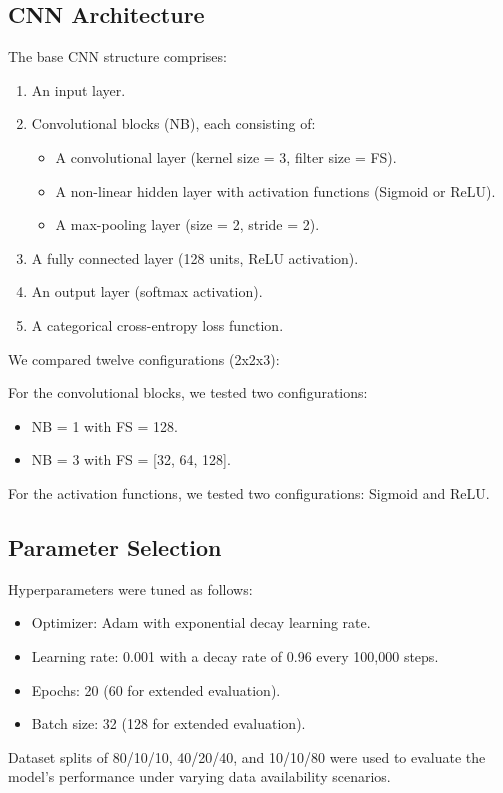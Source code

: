\documentclass[11pt]{article}
\begin{document}
\subsection{CNN Architecture}
The base CNN structure comprises:
\begin{enumerate}
    \item An input layer.
    \item Convolutional blocks (NB), each consisting of:
    \begin{itemize}
        \item A convolutional layer (kernel size = 3, filter size = FS).
        \item A non-linear hidden layer with activation functions (Sigmoid or ReLU).
        \item A max-pooling layer (size = 2, stride = 2).
    \end{itemize}
    \item A fully connected layer (128 units, ReLU activation).
    \item An output layer (softmax activation).
    \item A categorical cross-entropy loss function.
\end{enumerate}
We compared twelve configurations (2x2x3):

For the convolutional blocks, we tested two configurations:
\begin{itemize}
    \item NB = 1 with FS = 128.
    \item NB = 3 with FS = [32, 64, 128].
\end{itemize}

For the activation functions, we tested two configurations: Sigmoid and ReLU.



\subsection{Parameter Selection}
Hyperparameters were tuned as follows:
\begin{itemize}
    \item Optimizer: Adam with exponential decay learning rate.
    \item Learning rate: 0.001 with a decay rate of 0.96 every 100,000 steps.
    \item Epochs: 20 (60 for extended evaluation).
    \item Batch size: 32 (128 for extended evaluation).
\end{itemize}
Dataset splits of 80/10/10, 40/20/40, and 10/10/80 were used to evaluate the model's performance under varying data availability scenarios.
\end{document}
